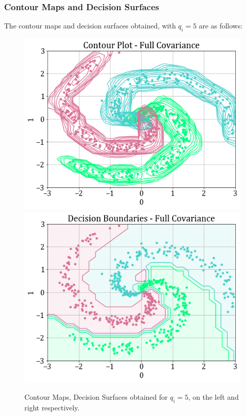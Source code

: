 \documentclass[11pt,a4paper]{article}
\begin{document}
\subsubsection{Contour Maps and Decision Surfaces}
The contour maps and decision surfaces obtained, with $q_i=5$ are as follows:
\begin{figure}[H]
    \hspace{-1em}
    \includegraphics[scale=0.5]{images/1B/1b_full_contours.png}
    \includegraphics[scale=0.5]{images/1B/1b_full_decision_surfaces.png}
    \caption{Contour Maps, Decision Surfaces obtained for $q_i=5$, on the left and right respectively.}
\end{figure}
\end{document}
